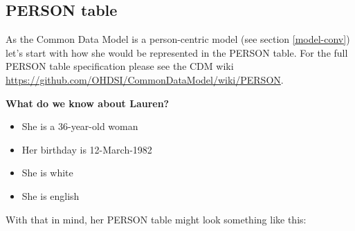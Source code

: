 \documentclass[]{book}
\providecommand{\tightlist}{%
  \setlength{\itemsep}{0pt}\setlength{\parskip}{0pt}}
\begin{document}
\hypertarget{person}{%
\subsection{PERSON table}\label{person}}

As the Common Data Model is a person-centric model (see section \ref{model-conv}) let's start with how she would be represented in the PERSON table. For the full PERSON table specification please see the CDM wiki \url{https://github.com/OHDSI/CommonDataModel/wiki/PERSON}.

\textbf{What do we know about Lauren?}

\begin{itemize}
\tightlist
\item
  She is a 36-year-old woman
\item
  Her birthday is 12-March-1982
\item
  She is white
\item
  She is english
\end{itemize}

With that in mind, her PERSON table might look something like this:
\end{document}
